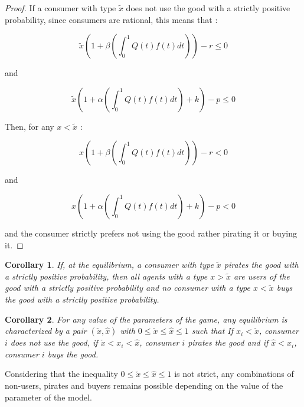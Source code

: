 \documentclass[11pt]{article}
\newtheorem{corollary}{Corollary}
\begin{document}
\begin{proof}

If a consumer with type $\tilde{x}$ does not use the good with a strictly positive probability, since consumers are rational, this means that : 

\begin{equation}
\tilde{x}(1+\beta (\int^{1}_{0}Q(t)f(t)dt))-r \leq 0
\end{equation}

and

\begin{equation}
\tilde{x}(1+\alpha (\int^{1}_{0}Q(t)f(t)dt)+k)-p \leq  0 
\end{equation}


Then, for any $x<\tilde{x}$ :

\begin{equation}
x(1+\beta (\int^{1}_{0}Q(t)f(t)dt))-r < 0
\end{equation}

and

\begin{equation}
x(1+\alpha (\int^{1}_{0}Q(t)f(t)dt)+k)-p <  0 
\end{equation}

and the consumer strictly prefers not using the good rather pirating it or buying it.


\end{proof}

\begin{corollary}
If, at the equilibrium, a consumer with type $\tilde{x}$ pirates the good with a strictly positive probability, then all agents with a type $x>\tilde{x}$ are users of the good with a strictly positive probability and no consumer  with a type $x<\tilde{x}$ buys the good with a strictly positive probability.
\end{corollary}

\begin{corollary}
For any value of the parameters of the game, any equilibrium is characterized by a pair $(\check{x},\hat{x})$ with $0\leq \check{x} \leq \hat{x} \leq 1$ such that If $x_i<\check{x}$, consumer $i$ does not use the good, if $\check{x} <x_i <\hat{x}$, consumer $i$ pirates the good and if $\hat{x}<x_i$, consumer $i$ buys the good. 
\end{corollary}

Considering that the inequality $0\leq \check{x} \leq \hat{x} \leq 1$ is not strict, any combinations of non-users, pirates and buyers remains possible depending on the value of the parameter of the model.
\end{document}
